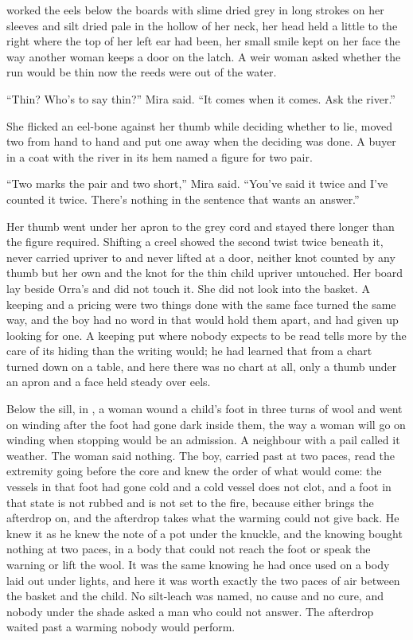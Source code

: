  worked the eels below the boards with slime dried grey in long strokes on her sleeves and silt dried pale in the hollow of her neck, her head held a little to the right where the top of her left ear had been, her small smile kept on her face the way another woman keeps a door on the latch. A weir woman asked whether the run would be thin now the reeds were out of the water.

“Thin? Who's to say thin?” Mira said. “It comes when it comes. Ask the river.”

She flicked an eel-bone against her thumb while deciding whether to lie, moved two from hand to hand and put one away when the deciding was done. A buyer in a coat with the river in its hem named a figure for two pair.

“Two marks the pair and two short,” Mira said. “You've said it twice and I've counted it twice. There's nothing in the sentence that wants an answer.”

Her thumb went under her apron to the grey cord and stayed there longer than the figure required. Shifting a creel showed the second twist twice beneath it, never carried upriver to  and never lifted at a door, neither knot counted by any thumb but her own and the knot for the thin child upriver untouched. Her board lay beside Orra's and did not touch it. She did not look into the basket. A keeping and a pricing were two things done with the same face turned the same way, and the boy had no word in  that would hold them apart, and had given up looking for one. A keeping put where nobody expects to be read tells more by the care of its hiding than the writing would; he had learned that from a chart turned down on a table, and here there was no chart at all, only a thumb under an apron and a face held steady over eels.

\scenebreak

Below the sill, in , a woman wound a child's foot in three turns of wool and went on winding after the foot had gone dark inside them, the way a woman will go on winding when stopping would be an admission. A neighbour with a pail called it weather. The woman said nothing. The boy, carried past at two paces, read the extremity going before the core and knew the order of what would come: the vessels in that foot had gone cold and a cold vessel does not clot, and a foot in that state is not rubbed and is not set to the fire, because either brings the afterdrop on, and the afterdrop takes what the warming could not give back. He knew it as he knew the note of a pot under the knuckle, and the knowing bought nothing at two paces, in a body that could not reach the foot or speak the warning or lift the wool. It was the same knowing he had once used on a body laid out under lights, and here it was worth exactly the two paces of air between the basket and the child. No silt-leach was named, no cause and no cure, and nobody under the shade asked a man who could not answer. The afterdrop waited past a warming nobody would perform.

